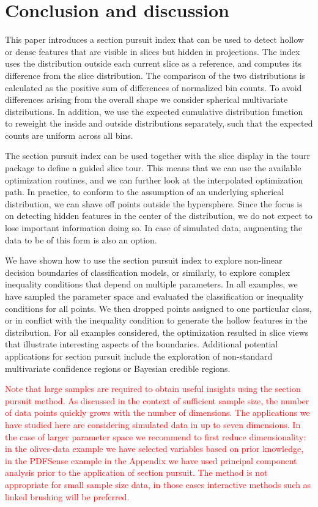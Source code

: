 \documentclass[]{interact}
\theoremstyle{plain}%
\theoremstyle{definition}
\theoremstyle{remark}
\begin{document}
\hypertarget{conclusion-and-discussion}{%
\section{Conclusion and discussion}\label{conclusion-and-discussion}}

This paper introduces a section pursuit index that can be used to detect
hollow or dense features that are visible in slices but hidden in
projections. The index uses the distribution outside each current slice
as a reference, and computes its difference from the slice distribution.
The comparison of the two distributions is calculated as the positive
sum of differences of normalized bin counts. To avoid differences
arising from the overall shape we consider spherical multivariate
distributions. In addition, we use the expected cumulative distribution
function to reweight the inside and outside distributions separately,
such that the expected counts are uniform across all bins.

The section pursuit index can be used together with the slice display in
the tourr package to define a guided slice tour. This means that we can
use the available optimization routines, and we can further look at the
interpolated optimization path. In practice, to conform to the
assumption of an underlying spherical distribution, we can shave off
points outside the hypersphere. Since the focus is on detecting hidden
features in the center of the distribution, we do not expect to lose
important information doing so. In case of simulated data, augmenting
the data to be of this form is also an option.

We have shown how to use the section pursuit index to explore non-linear
decision boundaries of classification models, or similarly, to explore
complex inequality conditions that depend on multiple parameters. In all
examples, we have sampled the parameter space and evaluated the
classification or inequality conditions for all points. We then dropped
points assigned to one particular class, or in conflict with the
inequality condition to generate the hollow features in the
distribution. For all examples considered, the optimization resulted in
slice views that illustrate interesting aspects of the boundaries.
Additional potential applications for section pursuit include the
exploration of non-standard multivariate confidence regions or Bayesian
credible regions.

\textcolor{red}{Note that large samples are required to obtain useful insights using the section pursuit method. As discussed in the context of sufficient sample size, the number of data points quickly grows with the number of dimensions. The applications we have studied here are considering simulated data in up to seven dimensions. In the case of larger parameter space we recommend to first reduce dimensionality: in the olives-data example we have selected variables based on prior knowledge, in the PDFSense example in the Appendix we have used principal component analysis prior to the application of section pursuit. The method is not appropriate for small sample size data, in those cases interactive methods such as linked brushing will be preferred.}
\end{document}
